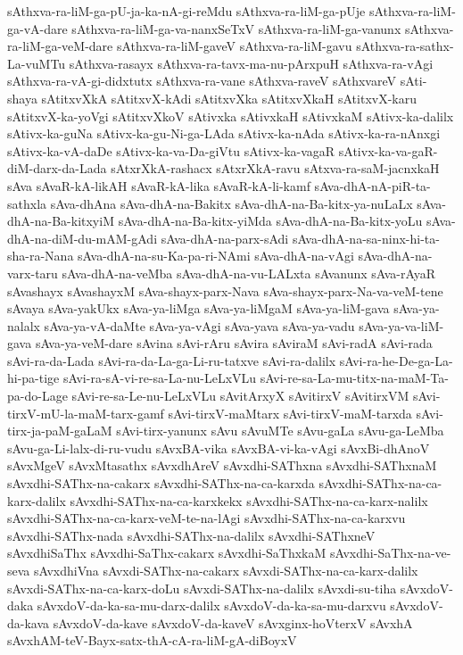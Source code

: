 {sAthxva-ra-liM-ga-pU-ja-ka-nA-gi-reMdu
sAthxva-ra-liM-ga-pUje
sAthxva-ra-liM-ga-vA-dare
sAthxva-ra-liM-ga-va-nanxSeTxV
sAthxva-ra-liM-ga-vanunx
sAthxva-ra-liM-ga-veM-dare
sAthxva-ra-liM-gaveV
sAthxva-ra-liM-gavu
sAthxva-ra-sathx-La-vuMTu
sAthxva-rasayx
sAthxva-ra-tavx-ma-nu-pArxpuH
sAthxva-ra-vAgi
sAthxva-ra-vA-gi-didxtutx
sAthxva-ra-vane
sAthxva-raveV
sAthxvareV
sAti-shaya
sAtitxvXkA
sAtitxvX-kAdi
sAtitxvXka
sAtitxvXkaH
sAtitxvX-karu
sAtitxvX-ka-yoVgi
sAtitxvXkoV
sAtivxka
sAtivxkaH
sAtivxkaM
sAtivx-ka-dalilx
sAtivx-ka-guNa
sAtivx-ka-gu-Ni-ga-LAda
sAtivx-ka-nAda
sAtivx-ka-ra-nAnxgi
sAtivx-ka-vA-daDe
sAtivx-ka-va-Da-giVtu
sAtivx-ka-vagaR
sAtivx-ka-va-gaR-diM-darx-da-Lada
sAtxrXkA-rashacx
sAtxrXkA-ravu
sAtxva-ra-saM-jacnxkaH
sAva
sAvaR-kA-likAH
sAvaR-kA-lika
sAvaR-kA-li-kamf
sAva-dhA-nA-piR-ta-sathxla
sAva-dhAna
sAva-dhA-na-Bakitx
sAva-dhA-na-Ba-kitx-ya-nuLaLx
sAva-dhA-na-Ba-kitxyiM
sAva-dhA-na-Ba-kitx-yiMda
sAva-dhA-na-Ba-kitx-yoLu
sAva-dhA-na-diM-du-mAM-gAdi
sAva-dhA-na-parx-sAdi
sAva-dhA-na-sa-ninx-hi-ta-sha-ra-Nana
sAva-dhA-na-su-Ka-pa-ri-NAmi
sAva-dhA-na-vAgi
sAva-dhA-na-varx-taru
sAva-dhA-na-veMba
sAva-dhA-na-vu-LALxta
sAvanunx
sAva-rAyaR
sAvashayx
sAvashayxM
sAva-shayx-parx-Nava
sAva-shayx-parx-Na-va-veM-tene
sAvaya
sAva-yakUkx
sAva-ya-liMga
sAva-ya-liMgaM
sAva-ya-liM-gava
sAva-ya-nalalx
sAva-ya-vA-daMte
sAva-ya-vAgi
sAva-yava
sAva-ya-vadu
sAva-ya-va-liM-gava
sAva-ya-veM-dare
sAvina
sAvi-rAru
sAvira
sAviraM
sAvi-radA
sAvi-rada
sAvi-ra-da-Lada
sAvi-ra-da-La-ga-Li-ru-tatxve
sAvi-ra-dalilx
sAvi-ra-he-De-ga-La-hi-pa-tige
sAvi-ra-sA-vi-re-sa-La-nu-LeLxVLu
sAvi-re-sa-La-mu-titx-na-maM-Ta-pa-do-Lage
sAvi-re-sa-Le-nu-LeLxVLu
sAvitArxyX
sAvitirxV
sAvitirxVM
sAvi-tirxV-mU-la-maM-tarx-gamf
sAvi-tirxV-maMtarx
sAvi-tirxV-maM-tarxda
sAvi-tirx-ja-paM-gaLaM
sAvi-tirx-yanunx
sAvu
sAvuMTe
sAvu-gaLa
sAvu-ga-LeMba
sAvu-ga-Li-lalx-di-ru-vudu
sAvxBA-vika
sAvxBA-vi-ka-vAgi
sAvxBi-dhAnoV
sAvxMgeV
sAvxMtasathx
sAvxdhAreV
sAvxdhi-SAThxna
sAvxdhi-SAThxnaM
sAvxdhi-SAThx-na-cakarx
sAvxdhi-SAThx-na-ca-karxda
sAvxdhi-SAThx-na-ca-karx-dalilx
sAvxdhi-SAThx-na-ca-karxkekx
sAvxdhi-SAThx-na-ca-karx-nalilx
sAvxdhi-SAThx-na-ca-karx-veM-te-na-lAgi
sAvxdhi-SAThx-na-ca-karxvu
sAvxdhi-SAThx-nada
sAvxdhi-SAThx-na-dalilx
sAvxdhi-SAThxneV
sAvxdhiSaThx
sAvxdhi-SaThx-cakarx
sAvxdhi-SaThxkaM
sAvxdhi-SaThx-na-ve-seva
sAvxdhiVna
sAvxdi-SAThx-na-cakarx
sAvxdi-SAThx-na-ca-karx-dalilx
sAvxdi-SAThx-na-ca-karx-doLu
sAvxdi-SAThx-na-dalilx
sAvxdi-su-tiha
sAvxdoV-daka
sAvxdoV-da-ka-sa-mu-darx-dalilx
sAvxdoV-da-ka-sa-mu-darxvu
sAvxdoV-da-kava
sAvxdoV-da-kave
sAvxdoV-da-kaveV
sAvxginx-hoVterxV
sAvxhA
sAvxhAM-teV-Bayx-satx-thA-cA-ra-liM-gA-diBoyxV
}
